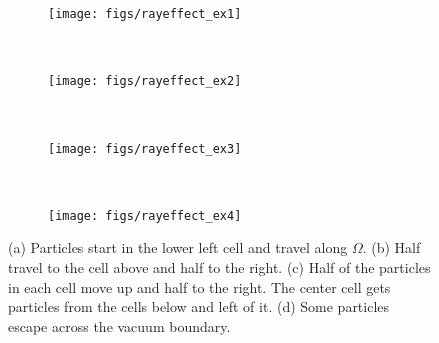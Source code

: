 \begin{figure}
    \centering
    \begin{subfigure}[b]{0.2\textwidth}
        \texttt{[image: figs/rayeffect\_ex1]}
        \caption{}
        \label{fig:rayeffect_ex1}
    \end{subfigure}
    ~ 
    \begin{subfigure}[b]{0.2\textwidth}
        \texttt{[image: figs/rayeffect\_ex2]}
        \caption{}
        \label{fig:rayeffect_ex2}
    \end{subfigure}
    ~ 
    \begin{subfigure}[b]{0.2\textwidth}
        \texttt{[image: figs/rayeffect\_ex3]}
        \caption{}
        \label{fig:rayeffect_ex3}
    \end{subfigure}
    ~
    \begin{subfigure}[b]{0.2\textwidth}
        \texttt{[image: figs/rayeffect\_ex4]}
        \caption{}
        \label{fig:rayeffect_ex4}
    \end{subfigure}
    \caption{(a) Particles start in the lower left cell and travel along $\Omega$. (b) Half travel to the cell above and half to the right. (c) Half of the particles in each cell move up and half to the right. The center cell gets particles from the cells below and left of it. (d) Some particles escape across the vacuum boundary. }\label{fig:rayeffect_ex}
\end{figure}

